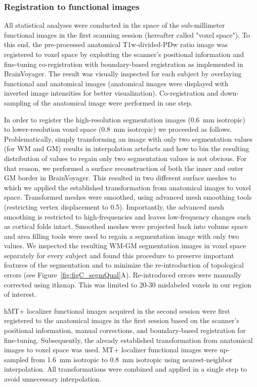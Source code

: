 \subsubsection{Registration to functional images}
All statistical analyses were conducted in the space of the sub-millimeter functional images in the first scanning session (hereafter called "voxel space"). To this end, the pre-processed anatomical T1w-divided-PDw ratio image was registered to voxel space by exploiting the scanner’s positional information and fine-tuning co-registration with boundary-based registration \parencite{Greve2009} as implemented in BrainVoyager. The result was visually inspected for each subject by overlaying functional and anatomical images (anatomical images were displayed with inverted image intensities for better visualization). Co-registration and down-sampling of the anatomical image were performed in one step.

In order to register the high-resolution segmentation images (0.6~mm isotropic) to lower-resolution voxel space (0.8~mm isotropic) we proceeded as follows. Problematically, simply transforming an image with only two segmentation values (for WM and GM) results in interpolation artefacts and how to bin the resulting distribution of values to regain only two segmentation values is not obvious. For that reason, we performed a surface reconstruction of both the inner and outer GM border in BrainVoyager. This resulted in two different surface meshes to which we applied the established transformation from anatomical images to voxel space. Transformed meshes were smoothed, using advanced mesh smoothing tools (restricting vertex displacement to 0.5). Importantly, the advanced mesh smoothing is restricted to high-frequencies and leaves low-frequency changes such as cortical folds intact. Smoothed meshes were projected back into volume space and area filling tools were used to regain a segmentation image with only two values. We inspected the resulting WM-GM segmentation images in voxel space separately for every subject and found this procedure to preserve important features of the segmentation and to minimize the re-introduction of topological errors (see Figure~\ref{fig:figC_segmQual}A). Re-introduced errors were manually corrected using itksnap. This was limited to 20-30 mislabeled voxels in our region of interest.

hMT+ localizer functional images acquired in the second session were first registered to the anatomical images in the first session based on the scanner’s positional information, manual corrections, and boundary-based registration \parencite{Greve2009} for fine-tuning. Subsequently, the already established transformation from anatomical images to voxel space was used. MT+ localizer functional images were up-sampled from 1.6~mm isotropic to 0.8~mm isotropic using nearest-neighbor interpolation. All transformations were combined and applied in a single step to avoid unnecessary interpolation.

